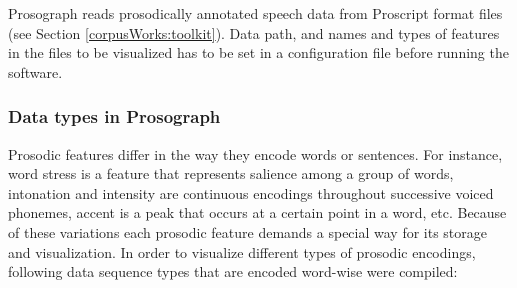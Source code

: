 Prosograph reads prosodically annotated speech data from Proscript format files (see Section \ref{corpusWorks:toolkit}). Data path, and names and types of features in the files to be visualized has to be set in a configuration file before running the software. 

\subsubsection{Data types in Prosograph}
Prosodic features differ in the way they encode words or sentences. For instance, word stress is a feature that represents salience among a group of words, intonation and intensity are continuous encodings throughout successive voiced phonemes, accent is a peak that occurs at a certain point in a word, etc. Because of these variations each prosodic feature demands a special way for its storage and visualization. In order to visualize different types of prosodic encodings, following data sequence types that are encoded word-wise were compiled:




